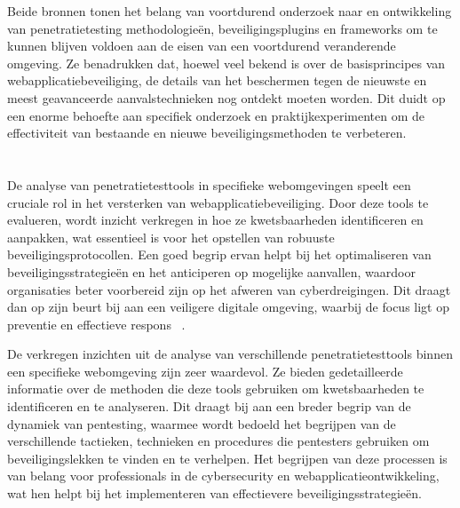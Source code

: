 Beide bronnen tonen het belang van voortdurend onderzoek naar en ontwikkeling van penetratietesting methodologieën, beveiligingsplugins en frameworks om te kunnen 
blijven voldoen aan de eisen van een voortdurend veranderende omgeving. Ze benadrukken dat, hoewel veel bekend is over de basisprincipes van webapplicatiebeveiliging, 
de details van het beschermen tegen de nieuwste en meest geavanceerde aanvalstechnieken nog ontdekt moeten worden. Dit duidt op een enorme behoefte aan 
specifiek onderzoek en praktijkexperimenten om de effectiviteit van bestaande en nieuwe beveiligingsmethoden te verbeteren.

\section{}
\subsection{}
De analyse van penetratietesttools in specifieke webomgevingen speelt een cruciale rol in het versterken van webapplicatiebeveiliging. Door deze tools 
te evalueren, wordt inzicht verkregen in hoe ze kwetsbaarheden identificeren en aanpakken, wat essentieel is voor het opstellen van robuuste beveiligingsprotocollen. 
Een goed begrip ervan helpt bij het optimaliseren van beveiligingsstrategieën en het anticiperen op mogelijke aanvallen, waardoor organisaties beter voorbereid zijn op het 
afweren van cyberdreigingen. Dit draagt dan op zijn beurt bij aan een veiligere digitale omgeving, waarbij de focus ligt op preventie en effectieve respons
~\autocite{Jarupunphol2023}.

De verkregen inzichten uit de analyse van verschillende penetratietesttools binnen een specifieke webomgeving zijn zeer waardevol. Ze bieden gedetailleerde informatie 
over de methoden die deze tools gebruiken om kwetsbaarheden te identificeren en te analyseren. Dit draagt bij aan een breder begrip van de dynamiek van pentesting, waarmee 
wordt bedoeld het begrijpen van de verschillende tactieken, technieken en procedures die pentesters gebruiken om beveiligingslekken te vinden en te verhelpen. Het 
begrijpen van deze processen is van belang voor professionals in de cybersecurity en webapplicatieontwikkeling, wat hen helpt bij het implementeren van effectievere 
beveiligingsstrategieën.

